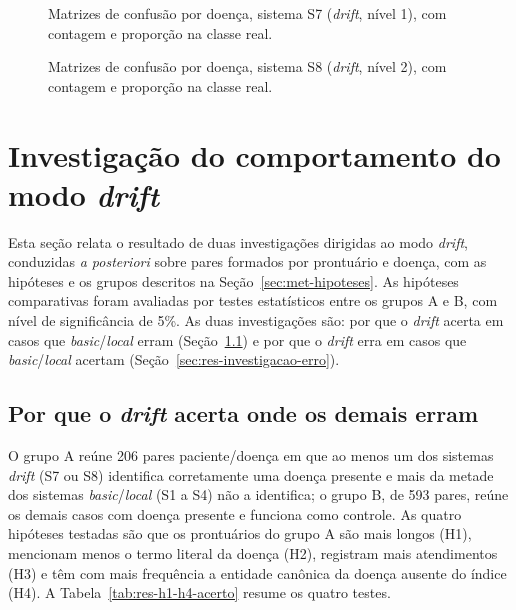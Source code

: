 \begin{figure}[!htbp]
\centering

\caption[Matrizes de confusão por doença, sistema S7]{Matrizes de confusão por doença, sistema S7 (\textit{drift}, nível 1), com contagem e proporção na classe real.}
\label{fig:res-confusao-s7}
\par{}
\end{figure}

\begin{figure}[!htbp]
\centering

\caption[Matrizes de confusão por doença, sistema S8]{Matrizes de confusão por doença, sistema S8 (\textit{drift}, nível 2), com contagem e proporção na classe real.}
\label{fig:res-confusao-s8}
\par{}
\end{figure}

\section{Investigação do comportamento do modo \textit{drift}}\label{sec:res-investigacao}

Esta seção relata o resultado de duas investigações dirigidas ao modo \textit{drift}, conduzidas \textit{a posteriori} sobre pares formados por prontuário e doença, com as hipóteses e os grupos descritos na Seção~\ref{sec:met-hipoteses}. As hipóteses comparativas foram avaliadas por testes estatísticos entre os grupos A e B, com nível de significância de 5\%. As duas investigações são: por que o \textit{drift} acerta em casos que \textit{basic}/\textit{local} erram (Seção~\ref{sec:res-investigacao-acerto}) e por que o \textit{drift} erra em casos que \textit{basic}/\textit{local} acertam (Seção~\ref{sec:res-investigacao-erro}).

\subsection{Por que o \textit{drift} acerta onde os demais erram}\label{sec:res-investigacao-acerto}

O grupo A reúne 206 pares paciente/doença em que ao menos um dos sistemas \textit{drift} (S7 ou S8) identifica corretamente uma doença presente e mais da metade dos sistemas \textit{basic}/\textit{local} (S1 a S4) não a identifica; o grupo B, de 593 pares, reúne os demais casos com doença presente e funciona como controle. As quatro hipóteses testadas são que os prontuários do grupo A são mais longos (H1), mencionam menos o termo literal da doença (H2), registram mais atendimentos (H3) e têm com mais frequência a entidade canônica da doença ausente do índice (H4). A Tabela~\ref{tab:res-h1-h4-acerto} resume os quatro testes.

